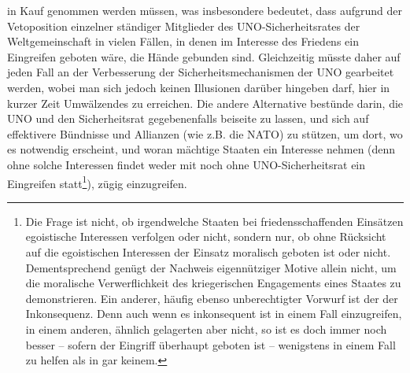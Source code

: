 \documentclass[12pt,a4paper,ngerman]{article}
\begin{document}
in Kauf genommen werden müssen, was insbesondere bedeutet, dass
aufgrund der Vetoposition einzelner ständiger Mitglieder des
UNO-Sicherheitsrates der Weltgemeinschaft in vielen Fällen, in denen
im Interesse des Friedens ein Eingreifen geboten wäre, die Hände
gebunden sind.  Gleichzeitig müsste daher auf jeden Fall an der
Verbesserung der Sicherheitsmechanismen der UNO gearbeitet werden,
wobei man sich jedoch keinen Illusionen darüber hingeben darf, hier in
kurzer Zeit Umwälzendes zu erreichen. Die andere Alternative bestünde
darin, die UNO und den Sicherheitsrat gegebenenfalls beiseite zu
lassen, und sich auf effektivere Bündnisse und Allianzen (wie z.B. die
NATO) zu stützen, um dort, wo es notwendig erscheint, und woran
mächtige Staaten ein Interesse nehmen (denn ohne solche Interessen
findet weder mit noch ohne UNO-Sicherheitsrat ein Eingreifen
statt\footnote{Die Frage ist nicht, ob irgendwelche Staaten bei
  friedensschaffenden Einsätzen egoistische Interessen verfolgen oder
  nicht, sondern nur, ob ohne Rücksicht auf die egoistischen
  Interessen der Einsatz moralisch geboten ist oder nicht.
  Dementsprechend genügt der Nachweis eigennütziger Motive allein
  nicht, um die moralische Verwerflichkeit des kriegerischen
  Engagements eines Staates zu demonstrieren. Ein anderer, häufig
  ebenso unberechtigter Vorwurf ist der der Inkonsequenz. Denn auch
  wenn es inkonsequent ist in einem Fall einzugreifen, in einem
  anderen, ähnlich gelagerten aber nicht, so ist es doch immer noch
  besser -- sofern der Eingriff überhaupt geboten ist -- wenigstens in
  einem Fall zu helfen als in gar keinem.}), zügig einzugreifen.
\end{document}
